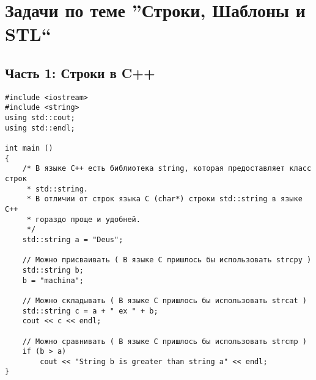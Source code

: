 \documentclass{article}
\begin{document}



\section*{Задачи по теме ''Строки, Шаблоны и STL``}
\subsection*{Часть 1: Строки в C++}
\begin{lstlisting}
#include <iostream>
#include <string> 
using std::cout;
using std::endl;

int main () 
{
    /* В языке C++ есть библиотека string, которая предоставляет класс строк
     * std::string.
     * В отличии от строк языка C (char*) строки std::string в языке C++
     * гораздо проще и удобней.
     */
    std::string a = "Deus";
    
    // Можно присваивать ( В языке C пришлось бы использовать strcpy )
    std::string b;
    b = "machina";
	
    // Можно складывать ( В языке C пришлось бы использовать strcat )
    std::string c = a + " ex " + b;
    cout << c << endl;
    
    // Можно сравнивать ( В языке C пришлось бы использовать strcmp )
    if (b > a)
        cout << "String b is greater than string a" << endl;
}

\end{lstlisting}
\end{document}

